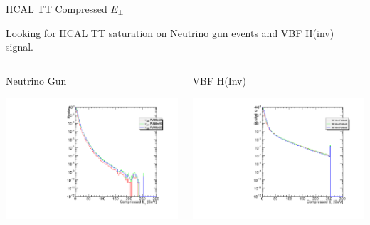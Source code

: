 \documentclass[8pt]{beamer}
\begin{document}
\begin{frame}{HCAL TT Compressed $E_{\perp}$}

Looking for HCAL TT saturation on Neutrino gun events and VBF H(inv) signal.

\begin{columns}
 
\begin{block}{Neutrino Gun}
\centering

\includegraphics[width=\linewidth]{fig/HcalTT_Val_NG.pdf}

\end{block}

\begin{block}{VBF H(Inv)}
\centering

\includegraphics[width=\linewidth]{fig/HcalTT_Val_Sig.pdf}


\end{block}
\end{columns}
\end{frame}
\end{document}
